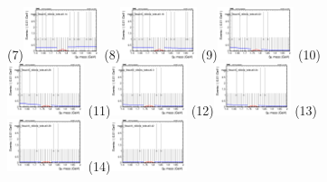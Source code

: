 \begin{figure}[h!]
        \subfigure(7){\includegraphics[width=0.2\textwidth]{unfixed_exp/plots/tauhA/massfit_tauhA_40bins_bdtcut0.14.png}}
        \subfigure(8){\includegraphics[width=0.2\textwidth]{unfixed_exp/plots/tauhA/massfit_tauhA_40bins_bdtcut0.18.png}}
        \subfigure(9){\includegraphics[width=0.2\textwidth]{unfixed_exp/plots/tauhA/massfit_tauhA_40bins_bdtcut0.22.png}}
        \subfigure(10){\includegraphics[width=0.2\textwidth]{unfixed_exp/plots/tauhA/massfit_tauhA_40bins_bdtcut0.26.png}}
        \subfigure(11){\includegraphics[width=0.2\textwidth]{unfixed_exp/plots/tauhA/massfit_tauhA_40bins_bdtcut0.3.png}}
        \subfigure(12){\includegraphics[width=0.2\textwidth]{unfixed_exp/plots/tauhA/massfit_tauhA_40bins_bdtcut0.34.png}}
        \subfigure(13){\includegraphics[width=0.2\textwidth]{unfixed_exp/plots/tauhA/massfit_tauhA_40bins_bdtcut0.38.png}}
        \subfigure(14){\includegraphics[width=0.2\textwidth]{unfixed_exp/plots/tauhA/massfit_tauhA_40bins_bdtcut0.42.png}}

\end{figure}
